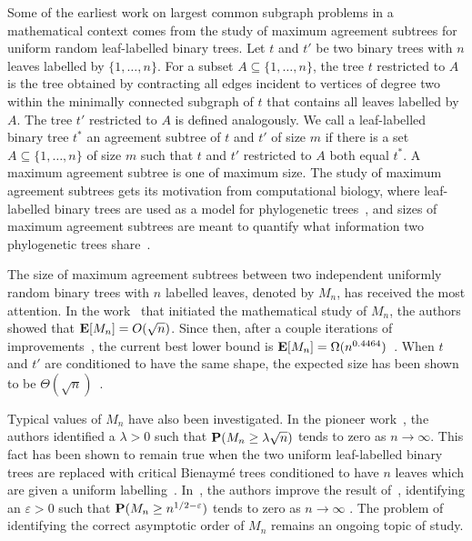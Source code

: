 \documentclass[11pt,reqno]{amsart}
\begin{document}
Some of the earliest work on largest common subgraph problems in a mathematical context comes from the study of maximum agreement subtrees for uniform random leaf-labelled binary trees. Let $t$ and $t'$ be two binary trees with $n$ leaves labelled by $\{1,\ldots,n\}$. For a subset $A \subseteq \{1,\ldots,n\}$, the tree $t$ restricted to $A$ is the tree obtained by contracting all edges incident to vertices of degree two within the minimally connected subgraph of $t$ that contains all leaves labelled by $A$. The tree $t'$ restricted to $A$ is defined analogously. We call a leaf-labelled binary tree $t^*$ an agreement subtree of $t$ and $t'$ of size $m$ if there is a set $A \subseteq \{1,\ldots,n\}$ of size $m$ such that $t$ and $t'$ restricted to $A$ both equal $t^*$. A maximum agreement subtree is one of maximum size. The study of maximum agreement subtrees gets its motivation from computational biology, where leaf-labelled binary trees are used as a model for phylogenetic trees~\cite{semple2003phylogenetics}, and sizes of maximum agreement subtrees are meant to quantify what information two phylogenetic trees share~\cite{david2003size}. 

The size of maximum agreement subtrees between two independent uniformly random binary trees with $n$ labelled leaves, denoted by $M_n$, has received the most attention. In the work~\cite{david2003size} that initiated the mathematical study of $M_n$, the authors showed that $\mathbf{E}[M_n] = O(\sqrt{n})$. Since then, after a couple iterations of improvements~\cite{bernstein2015bounds,aldous2022largest}, the current best lower bound is $\mathbf{E}[M_n] = \Omega(n^{0.4464})$~\cite{khezeli2024improved}. When $t$ and $t'$ are conditioned to have the same shape, the expected size has been shown to be $\Theta(\sqrt{n})$~\cite{misra2019bounds}.

Typical values of $M_n$ have also been investigated. In the pioneer work~\cite{david2003size}, the authors identified a $\lambda > 0$ such that $\mathbf{P}(M_n \geq \lambda \sqrt{n})$ tends to zero as $n \to \infty$. This fact has been shown to remain true when the two uniform leaf-labelled binary trees are replaced with critical Bienaym\'{e} trees conditioned to have $n$ leaves which are given a uniform labelling~\cite{pittel2023expected}. In~\cite{budzinski2023maximum}, the authors improve the result of~\cite{david2003size}, identifying an $\varepsilon > 0$ such that $\mathbf{P}(M_n \geq n^{1/2-\varepsilon})$ tends to zero as $n \to \infty$ . The problem of identifying the correct asymptotic order of $M_n$ remains an ongoing topic of study.
\end{document}
